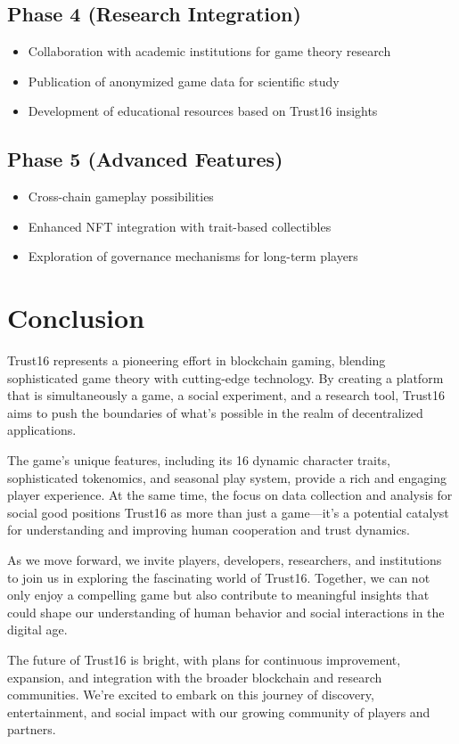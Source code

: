 \documentclass[]{article}
\begin{document}
\subsection{Phase 4 (Research Integration)}
\begin{itemize}
\item Collaboration with academic institutions for game theory research
\item Publication of anonymized game data for scientific study
\item Development of educational resources based on Trust16 insights
\end{itemize}

\subsection{Phase 5 (Advanced Features)}
\begin{itemize}
\item Cross-chain gameplay possibilities
\item Enhanced NFT integration with trait-based collectibles
\item Exploration of governance mechanisms for long-term players
\end{itemize}

\section{Conclusion}

Trust16 represents a pioneering effort in blockchain gaming, blending sophisticated game theory with cutting-edge technology. By creating a platform that is simultaneously a game, a social experiment, and a research tool, Trust16 aims to push the boundaries of what's possible in the realm of decentralized applications.

The game's unique features, including its 16 dynamic character traits, sophisticated tokenomics, and seasonal play system, provide a rich and engaging player experience. At the same time, the focus on data collection and analysis for social good positions Trust16 as more than just a game—it's a potential catalyst for understanding and improving human cooperation and trust dynamics.

As we move forward, we invite players, developers, researchers, and institutions to join us in exploring the fascinating world of Trust16. Together, we can not only enjoy a compelling game but also contribute to meaningful insights that could shape our understanding of human behavior and social interactions in the digital age.

The future of Trust16 is bright, with plans for continuous improvement, expansion, and integration with the broader blockchain and research communities. We're excited to embark on this journey of discovery, entertainment, and social impact with our growing community of players and partners.
\end{document}
